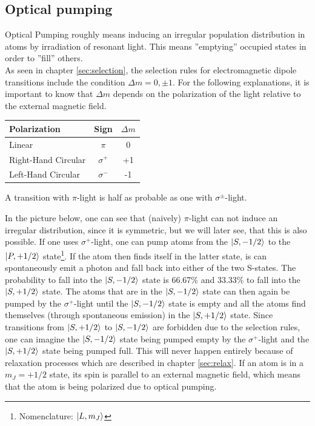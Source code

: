 \subsection{Optical pumping}
\label{sec:1}

Optical Pumping roughly means inducing an irregular population distribution in atoms by irradiation of resonant light. This means ''emptying'' occupied states in order to ''fill'' others. \\

As seen in chapter \ref{sec:selection}, the selection rules for electromagnetic dipole transitions include the condition $\Delta m = 0,\pm1$. For the following explanations, it is important to know that $\Delta m$ depends on the polarization of the light relative to the external magnetic field. 

\begin{center}
\begin{tabular}[H]{l c c}
Polarization & Sign & $\Delta m$ \\ \hline
Linear & $\pi$ & 0 \\
Right-Hand Circular & $\sigma^+$ & +1\\
Left-Hand Circular & $\sigma^-$ & -1\\
\end{tabular}
\end{center}

A transition with $\pi$-light is half as probable as one with $\sigma^\pm$-light.

In the picture below, one can see that (naively) $\pi$-light can not induce an irregular distribution, since it is symmetric, but we will later see, that this is also possible. If one uses $\sigma^+$-light, one can pump atoms from the $\ket{S,-1/2}$ to the $\ket{P,+1/2}$ state\footnote{Nomenclature: $\ket{L,m_J}$}. If the atom then finds itself in the latter state, is can spontaneously emit a photon and fall back into either of the two S-states. The probability to fall into the $\ket{S,-1/2}$ state is 66.67\% and 33.33\% to fall into the $\ket{S,+1/2}$ state. The atoms that are in the $\ket{S,-1/2}$ state can then again be pumped by the $\sigma^+$-light until the $\ket{S,-1/2}$ state is empty and all the atoms find themselves (through spontaneous emission) in the $\ket{S,+1/2}$ state. Since transitions from $\ket{S,+1/2}$ to $\ket{S,-1/2}$ are forbidden due to the selection rules, one can imagine the $\ket{S,-1/2}$ state being pumped empty by the $\sigma^+$-light and the $\ket{S,+1/2}$ state being pumped full. This will never happen entirely because of relaxation processes which are described in chapter \ref{sec:relax}.
If an atom is in a $m_J = +1/2$ state, its spin is parallel to an external magnetic field, which means that the atom is being polarized due to optical pumping. 

